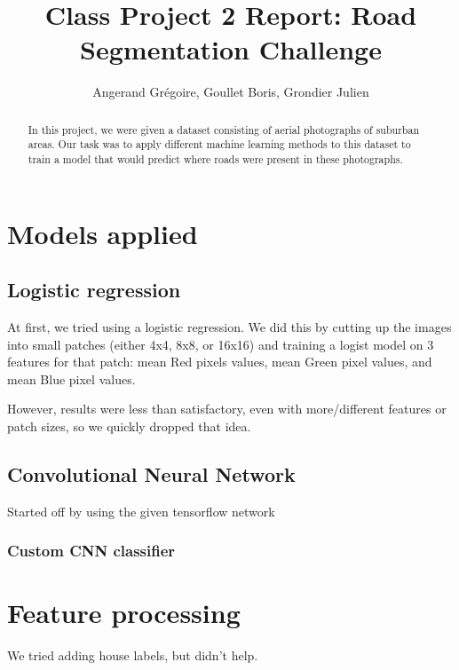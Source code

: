 \documentclass[11pt,conference,compsocconf]{IEEEtran}
\begin{document}
\title{Class Project 2 Report: Road Segmentation Challenge}

\author{
  Angerand Gr\'egoire, Goullet Boris, Grondier Julien 
}

\maketitle

\begin{abstract}
In this project, we were given a dataset consisting of aerial photographs of suburban areas. Our task was to apply different machine learning methods to this dataset to train a model that would predict where roads were present in these photographs.

\end{abstract}


\section{Models applied}

\subsection{Logistic regression}
At first, we tried using a logistic regression. We did this by cutting up the images into small patches (either 4x4, 8x8, or 16x16) and training a logist model on 3 features for that patch: mean Red pixels values, mean Green pixel values, and mean Blue pixel values.

However, results were less than satisfactory, even with more/different features or patch sizes, so we quickly dropped that idea.

\subsection{Convolutional Neural Network}
Started off by using the given tensorflow network

\subsubsection{Custom CNN classifier}


\section{Feature processing}

We tried adding house labels, but didn't help.
\end{document}
